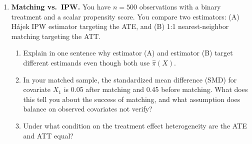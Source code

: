 \documentclass[master.tex]{subfiles}
\begin{document}
\begin{enumerate}
\item \textbf{Matching vs.\ IPW.}
  You have $n = 500$ observations with a binary treatment and a
  scalar propensity score.  You compare two estimators:
  (A) Hájek IPW estimator targeting the ATE, and
  (B) 1:1 nearest-neighbor matching targeting the ATT.
  \begin{enumerate}
    \item Explain in one sentence why estimator (A) and estimator (B)
      target different estimands even though both use $\hat\pi(X)$.
    \item In your matched sample, the standardized mean difference (SMD)
      for covariate $X_1$ is 0.05 after matching and 0.45 before
      matching.  What does this tell you about the success of matching,
      and what assumption does balance on observed covariates not verify?
    \item Under what condition on the treatment effect heterogeneity
      are the ATE and ATT equal?
  \end{enumerate}

\end{enumerate}

\ifSubfilesClassLoaded{%
  
  
}{}
\end{document}

